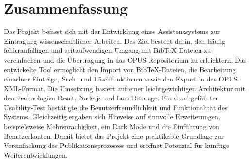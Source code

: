 \chapter*{Zusammenfassung}
Das Projekt befasst sich mit der Entwicklung eines Assistenzsystems zur 
Eintragung wissenschaftlicher Arbeiten. Das Ziel besteht darin, den 
häufig fehleranfälligen und zeitaufwendigen Umgang mit BibTeX-Dateien 
zu vereinfachen und die Übertragung in das OPUS-Repositorium zu erleichtern. 
Das entwickelte Tool ermöglicht den Import von BibTeX-Dateien, die Bearbeitung 
einzelner Einträge, Such- und Löschfunktionen sowie den Export in das 
OPUS-XML-Format. Die Umsetzung basiert auf einer leichtgewichtigen 
Architektur mit den Technologien React, Node.js und Local Storage. 
Ein durchgeführter Usability-Test bestätigte die Benutzerfreundlichkeit 
und Funktionalität des Systems. Gleichzeitig ergaben sich Hinweise auf 
sinnvolle Erweiterungen, beispielsweise Mehrsprachigkeit, ein Dark Mode 
und die Einführung von Benutzerkonten. Damit bietet das Projekt eine 
praktikable Grundlage zur Vereinfachung des Publikationsprozesses und 
eröffnet Potenzial für künftige Weiterentwicklungen.
